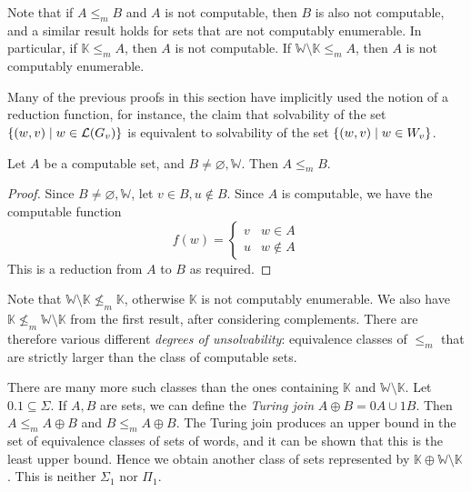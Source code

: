Note that if \( A \leq_m B \) and \( A \) is not computable, then \( B \) is also not computable, and a similar result holds for sets that are not computably enumerable.
In particular, if \( \mathbb K \leq_m A \), then \( A \) is not computable.
If \( \mathbb W \setminus \mathbb K \leq_m A \), then \( A \) is not computably enumerable.
\begin{remark}
	Many of the previous proofs in this section have implicitly used the notion of a reduction function, for instance, the claim that solvability of the set \( \qty{(w, v) \mid w \in \mathcal L(G_v)} \) is equivalent to solvability of the set \( \qty{(w, v) \mid w \in W_v} \).
\end{remark}
\begin{proposition}
	Let \( A \) be a computable set, and \( B \neq \varnothing, \mathbb W \).
	Then \( A \leq_m B \).
\end{proposition}
\begin{proof}
	Since \( B \neq \varnothing, \mathbb W \), let \( v \in B, u \not\in B \).
	Since \( A \) is computable, we have the computable function
	\[ f(w) = \begin{cases}
		v & w \in A \\
		u & w \not\in A
	\end{cases} \]
	This is a reduction from \( A \) to \( B \) as required.
\end{proof}
Note that \( \mathbb W \setminus \mathbb K \not\leq_m \mathbb K \), otherwise \( \mathbb K \) is not computably enumerable.
We also have \( \mathbb K \not\leq_m \mathbb W \setminus \mathbb K \) from the first result, after considering complements.
There are therefore various different \emph{degrees of unsolvability}: equivalence classes of \( \leq_m \) that are strictly larger than the class of computable sets.

There are many more such classes than the ones containing \( \mathbb K \) and \( \mathbb W \setminus \mathbb K \).
Let \( \qty{0, 1} \subseteq \Sigma \).
If \( A, B \) are sets, we can define the \emph{Turing join} \( A \oplus B = 0A \cup 1B \).
Then \( A \leq_m A \oplus B \) and \( B \leq_m A \oplus B \).
The Turing join produces an upper bound in the set of equivalence classes of sets of words, and it can be shown that this is the least upper bound.
Hence we obtain another class of sets represented by \( \mathbb K \oplus \mathbb W \setminus \mathbb K \).
This is neither \( \Sigma_1 \) nor \( \Pi_1 \).

